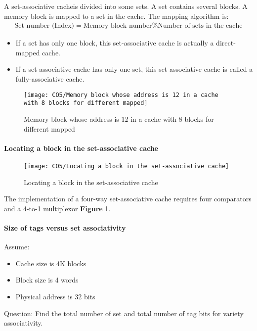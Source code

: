 A set-associative cacheis divided into some sets. A set contains several blocks. A memory block is mapped to a set in the cache. The mapping algorithm is:{\tiny
\begin{align*}
    \text{Set number (Index)}=\text{Memory block number}\%\text{Number of sets in the cache}
\end{align*}
}{\small
\begin{itemize}
    \item If a set has only one block, this set-associative cache is actually a direct-mapped cache.
    \item If a set-associative cache has only one set, this set-associative cache is called a fully-associative cache.
\end{itemize}
}

\begin{figure}[!htb]
    \centering
    \texttt{[image: CO5/Memory block whose address is 12 in a cache with 8 blocks for different mapped]}
    \caption{Memory block whose address is 12 in a cache with 8 blocks for different mapped}
\end{figure}


\paragraph{Locating a block in the set-associative cache}
\begin{figure}[!htb]
    \centering
    \texttt{[image: CO5/Locating a block in the set-associative cache]}
    \caption{Locating a block in the set-associative cache}
    \label{Locating a block in the set-associative cache}
\end{figure}
The implementation of a four-way set-associative cache requires four comparators and a 4-to-1 multiplexor \textbf{Figure} \ref{Locating a block in the set-associative cache}.

\paragraph{Size of tags versus set associativity}
Assume:
\begin{itemize}\small
    \item Cache size is 4K blocks
    \item Block size is 4 words
    \item Physical address is 32 bits
\end{itemize}

Question: Find the total number of set and total number of tag bits for variety associativity. 

